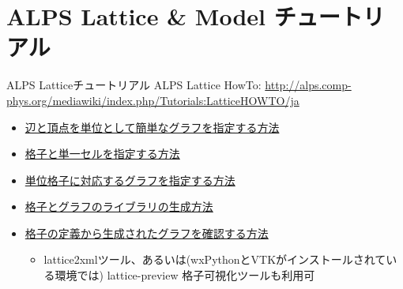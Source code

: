 \section{ALPS Lattice \& Model チュートリアル}

\begin{frame}{ALPS Latticeチュートリアル}
  ALPS Lattice HowTo: {\footnotesize \url{http://alps.comp-phys.org/mediawiki/index.php/Tutorials:LatticeHOWTO/ja}} \\
  \begin{itemize}
    \item \href{http://alps.comp-phys.org/mediawiki/index.php/Tutorials:LatticeHOWTO:SimpleGraphs/ja}{辺と頂点を単位として簡単なグラフを指定する方法}
    \item \href{http://alps.comp-phys.org/mediawiki/index.php/Tutorials:LatticesAndUnitCells/ja}{格子と単一セルを指定する方法}
    \item \href{http://alps.comp-phys.org/mediawiki/index.php/Tutorials:LatticesAndGraphs/ja}{単位格子に対応するグラフを指定する方法}
    \item \href{http://alps.comp-phys.org/mediawiki/index.php/Tutorials:LatticeHOWTO:Library/ja}{格子とグラフのライブラリの生成方法}
    \item \href{http://alps.comp-phys.org/mediawiki/index.php/Tutorials:LatticeHowto:CheckLattice/ja}{格子の定義から生成されたグラフを確認する方法}
      \begin{itemize}
      \item lattice2xmlツール、あるいは(wxPythonとVTKがインストールされている環境では) lattice-preview 格子可視化ツールも利用可
      \end{itemize}
  \end{itemize}
\end{frame}

